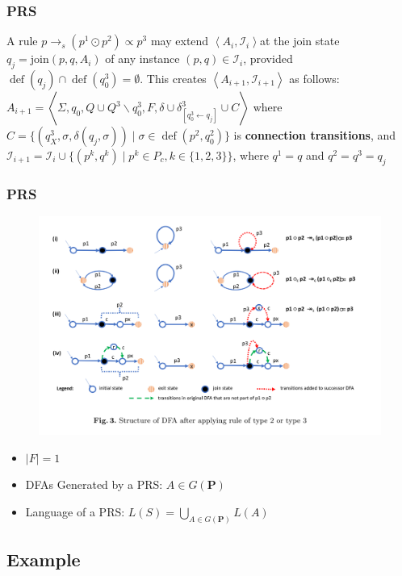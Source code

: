 \documentclass[aspectratio=169%
,serif,mathserif]{beamer}
\begin{document}
\begin{frame}
	\frametitle{PRS}
	\begin{definition}
		A rule $p \rightarrow_{s}\left(p^{1} \odot p^{2}\right) \propto p^{3}$ may extend
		$\left\langle A_{i}, \mathcal{I}_{i}\right\rangle $at the join state $q_{j}=\mathrm{join}\left(p, q, A_{i}\right)$
		of any instance $(p, q) \in \mathcal{I}_{i}$, provided 
		$\operatorname{def}(q_{j}) \cap \operatorname{def}\left(q_{0}^{3}\right)=\emptyset$.
		This creates $\left\langle A_{i+1}, \mathcal{I}_{i+1}\right\rangle$ 
		as follows: $A_{i+1}=\left\langle\Sigma, q_{0}, Q \cup Q^{3} \backslash q_{0}^{3}, F, \delta \cup \delta_{\left[q_{0}^{3} \leftarrow q_{j}\right]}^{3} \cup C\right\rangle$
		where $C  = \{(q_{X}^{3}, \sigma, \delta(q_{j}, \sigma)) \mid \sigma \in \operatorname{def}(p^{2}, q_{0}^{2})\}$ is \textbf{connection transitions}, 
		and $\mathcal{I}_{i+1}=\mathcal{I}_{i} \cup \{(p^{k}, q^{k}) \mid p^{k} \in P_{c}, k \in\{1,2,3\}\}$, 
		where $q^{1}=q$ and $q^{2}=q^{3}=q_{j}$
	\end{definition}
\end{frame}

\begin{frame}
	\frametitle{PRS}
	\begin{figure}
		\includegraphics[width=0.8\linewidth]{2.png}
	\end{figure}

	\begin{itemize}
		\item $|F| = 1$
		\item DFAs Generated by a PRS: $A \in G(\mathbf{P})$
		\item Language of a PRS: $L(S) = \bigcup\limits_{A \in G(\mathbf{P})} L(A)$
	\end{itemize}
\end{frame}

\subsection{Example}
\end{document}
